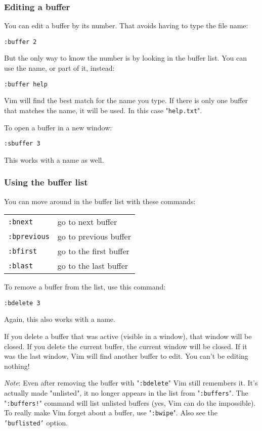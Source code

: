 \subsubsection{Editing a buffer}
You can edit a buffer by its number.
That avoids having to type the file name:
 
\begin{Verbatim}[samepage=true]
 :buffer 2
\end{Verbatim}

But the only way to know the number is by looking in the buffer list.
You can use the name, or part of it, instead:

\begin{Verbatim}[samepage=true]
 :buffer help
\end{Verbatim}

Vim will find the best match for the name you type.
If there is only one buffer that matches the name, it will be used.
In this case "\texttt{help.txt}".

To open a buffer in a new window:

\begin{Verbatim}[samepage=true]
 :sbuffer 3
\end{Verbatim}

This works with a name as well.
\subsubsection{Using the buffer list}
You can move around in the buffer list with these commands:

\begin{center} \begin{tabular}{l l}
				\texttt{:bnext} & go to next buffer \\
				\texttt{:bprevious} & go to previous buffer \\
				\texttt{:bfirst} & go to the first buffer \\
				\texttt{:blast} & go to the last buffer
\end{tabular} \end{center}
To remove a buffer from the list, use this command:

\begin{Verbatim}[samepage=true]
 :bdelete 3
\end{Verbatim}

Again, this also works with a name.

If you delete a buffer that was active (visible in a window), that window will be closed.
If you delete the current buffer, the current window will be closed.
If it was the last window, Vim will find another buffer to edit.
You can't be editing nothing!

\emph{Note}: Even after removing the buffer with "\texttt{:bdelete}" Vim still remembers it.
It's actually made "unlisted", it no longer appears in the list from "\texttt{:buffers}".
The "\texttt{:buffers!}" command will list unlisted buffers (yes, Vim can do the impossible).
To really make Vim forget about a buffer, use "\texttt{:bwipe}".
Also see the \texttt{'buflisted'} option.
\clearpage
